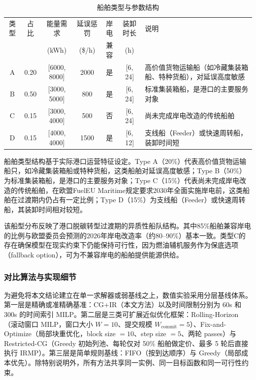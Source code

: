 \documentclass[UTF8, a4paper, 12pt]{ctexart}
\theoremstyle{plain}
\theoremstyle{definition}
\theoremstyle{remark}
\begin{document}
\begin{table}[htbp]
    \centering
    \caption{船舶类型与参数结构}
    \label{tab:ship_types}
    \scriptsize
    \renewcommand{\arraystretch}{1.3}
    \begin{threeparttable}
    \begin{tabular}{c c c c c c p{4cm}}
        \toprule
        类型 & 占比 & 能量需求 & 延误惩罚 & 岸电 & 装卸时长 & 说明 \\
        & & (kWh) & (\$/h) & 兼容 & (h) & \\
        \midrule
        A & 0.20 & [6000, 8000] & 2000 & 是 & [6, 24] & 高价值货物运输船（如冷藏集装箱船、特种货船），对延误高度敏感 \\
        \addlinespace
        B & 0.50 & [3000, 5000] & 800 & 是 & [6, 24] & 标准集装箱船，是港口的主要服务对象 \\
        \addlinespace
        C & 0.15 & [3000, 4000] & 500 & 否 & [6, 24] & 尚未完成岸电改造的传统船舶 \\
        \addlinespace
        D & 0.15 & [4000, 4000] & 1500 & 是 & [6, 12] & 支线船（Feeder）或快速周转船，装卸时间短 \\
        \bottomrule
    \end{tabular}
    \end{threeparttable}
\end{table}

船舶类型结构基于实际港口运营特征设定。Type A（20\%）代表高价值货物运输船只，如冷藏集装箱船或特种货船，这类船舶对延误高度敏感；Type B（50\%）为标准集装箱船，是港口的主要服务对象；Type C（15\%）代表尚未完成岸电改造的传统船舶，在欧盟FuelEU Maritime规定\cite{EU2025}要求2030年全面实施岸电前，这类船舶在过渡期内仍占有一定比例；Type D（15\%）为支线船（Feeder）或快速周转船，其装卸时间相对较短。

该船型分布反映了港口脱碳转型过渡期的异质性船队结构。其中85\%船舶兼容岸电的比例与欧盟委员会预测的2026年岸电改造率（约80--90\%）基本一致。类型C的存在确保模型在现实约束下仍能保持可行性，因为燃油辅机服务作为保底选项（fallback option），可为不兼容岸电的船舶提供能源供给。

\subsubsection{对比算法与实现细节}
\label{sec:baselines_impl}
为避免将本文结论建立在单一求解器或弱基线之上，数值实验采用分层基线体系。第一层是精确或准精确基准：CG+IR（本文方法）以及时间限制分别为 60s 和 300s 的时间索引 MILP。第二层是三类可扩展近似优化框架：Rolling-Horizon（滚动窗口 MILP，窗口大小 $W=10$、提交规模 $W_{\text{commit}}=5$）、Fix-and-Optimize（局部块重优化，block size $=10$、step size $=5$、两轮 passes）与 Restricted-CG（Greedy 初始列池、每轮仅对 50\% 船舶做定价、最多 5 轮后直接执行 IRMP）。第三层是简单规则基线：FIFO（按到达顺序）与 Greedy（局部成本优先）。除特别说明外，所有方法共享同一实例、同一目标函数和同一可行性约束。
\end{document}
